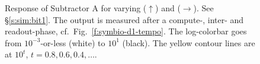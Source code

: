 \documentclass[12pt,notitlepage]{article}
\begin{document}
\begin{figure}[!p]
	
	\caption{%
		Response of Subtractor A
		for varying ($\uparrow$) and ($\rightarrow$).
		See \S\ref{s:sim:bit1}.
		The output 
		is measured after a compute-, inter- and readout-phase,
		cf.~Fig.~\ref{f:symbio-d1-tempo}.
		The log-colorbar goes from $10^{-3}$-or-less (white) to $10^1$ (black).
		The yellow contour lines are at $10^t$, $t = 0.8, 0.6, 0.4, \ldots$.
	}
	\label{f:sub_response}
\end{figure}

%
\end{document}
